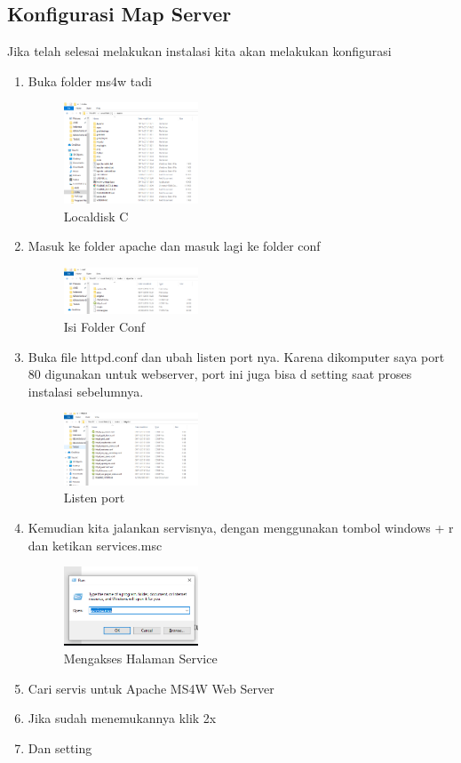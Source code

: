 \subsection{Konfigurasi Map Server}
Jika telah selesai melakukan instalasi kita akan melakukan konfigurasi
\begin{enumerate}
  \item Buka folder ms4w tadi
  \hfill\break
    \begin{figure}[H]
		\includegraphics[width=4cm]{figures/1174004/4/3.PNG}
		\centering
		\caption{Localdisk C}
    \end{figure}
  \item Masuk ke folder apache dan masuk lagi ke folder conf
  \hfill\break
    \begin{figure}[H]
		\includegraphics[width=4cm]{figures/1174004/4/4.PNG}
		\centering
		\caption{Isi Folder Conf}
    \end{figure}
  \item Buka file httpd.conf dan ubah listen port nya. Karena dikomputer saya port 80 digunakan untuk webserver, port ini juga bisa d setting saat proses instalasi sebelumnya.
  \hfill\break
    \begin{figure}[H]
		\includegraphics[width=4cm]{figures/1174004/4/5.PNG}
		\centering
		\caption{Listen port}
    \end{figure}
  \item Kemudian kita jalankan servisnya, dengan menggunakan tombol windows + r dan ketikan services.msc
  \hfill\break
    \begin{figure}[H]
		\includegraphics[width=4cm]{figures/1174004/4/6.PNG}
		\centering
		\caption{Mengakses Halaman Service}
    \end{figure}
  \item Cari servis untuk Apache MS4W Web Server
  \item Jika sudah menemukannya klik 2x
  \item Dan setting 
\end{enumerate}
